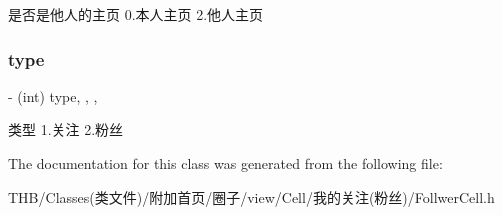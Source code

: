 是否是他人的主页 0.本人主页 2.他人主页 \mbox{\label{interface_follwer_cell_adde63249dd1767cd890059e3614016c1}} 
\subsubsection{\texorpdfstring{type}{type}}
{\footnotesize\ttfamily -\/ (int) type\hspace{0.3cm}{\ttfamily [read]}, {\ttfamily [write]}, {\ttfamily [nonatomic]}, {\ttfamily [assign]}}

类型 1.关注 2.粉丝 

The documentation for this class was generated from the following file\+:\begin{DoxyCompactItemize}
\item 
T\+H\+B/\+Classes(类文件)/附加首页/圈子/view/\+Cell/我的关注(粉丝)/Follwer\+Cell.\+h\end{DoxyCompactItemize}
